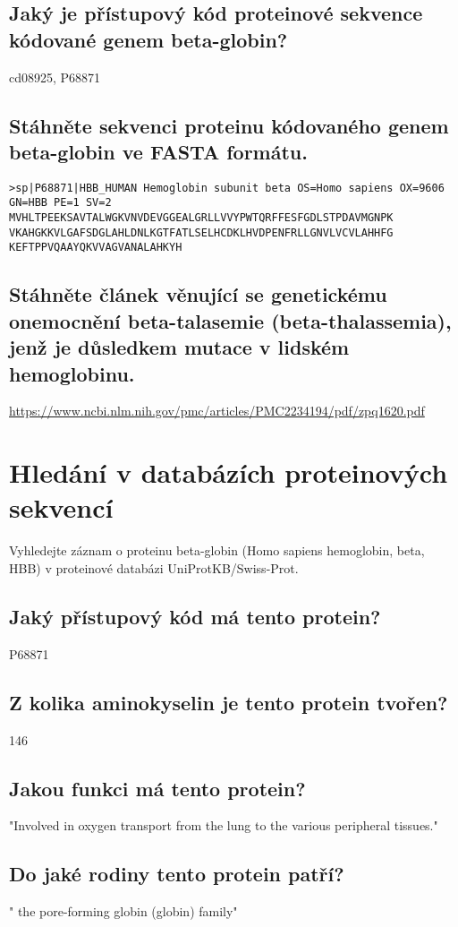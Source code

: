 \documentclass[11pt]{article}
\begin{document}
\subsection{Jaký je přístupový kód proteinové sekvence kódované genem beta-globin?}
\label{sec:orgaa11979}
cd08925, P68871
\subsection{Stáhněte sekvenci proteinu kódovaného genem beta-globin ve FASTA formátu.}
\label{sec:org6a32b35}
\begin{verbatim}
>sp|P68871|HBB_HUMAN Hemoglobin subunit beta OS=Homo sapiens OX=9606 GN=HBB PE=1 SV=2
MVHLTPEEKSAVTALWGKVNVDEVGGEALGRLLVVYPWTQRFFESFGDLSTPDAVMGNPK
VKAHGKKVLGAFSDGLAHLDNLKGTFATLSELHCDKLHVDPENFRLLGNVLVCVLAHHFG
KEFTPPVQAAYQKVVAGVANALAHKYH
\end{verbatim}
\subsection{Stáhněte článek věnující se genetickému onemocnění beta-talasemie (beta-thalassemia), jenž je důsledkem mutace v lidském hemoglobinu.}
\label{sec:org017cd8a}
\url{https://www.ncbi.nlm.nih.gov/pmc/articles/PMC2234194/pdf/zpq1620.pdf}

\section{Hledání v databázích proteinových sekvencí}
\label{sec:org02d6317}
Vyhledejte záznam o proteinu beta-globin (Homo sapiens hemoglobin, beta, HBB) v proteinové databázi UniProtKB/Swiss-Prot.

\subsection{Jaký přístupový kód má tento protein?}
\label{sec:orge0a32eb}
P68871
\subsection{Z kolika aminokyselin je tento protein tvořen?}
\label{sec:orgafc9613}
146
\subsection{Jakou funkci má tento protein?}
\label{sec:org871fbb5}
"Involved in oxygen transport from the lung to the various peripheral tissues."
\subsection{Do jaké rodiny tento protein patří?}
\label{sec:org76a5ddf}
" the pore-forming globin (globin) family"
\end{document}
